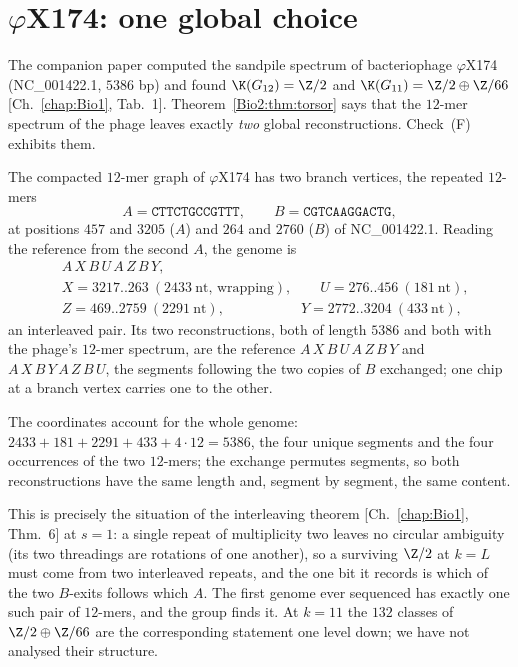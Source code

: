 \section{$\varphi$X174: one global choice}\label{Bio2:sec:phix}

The companion paper computed the sandpile spectrum of bacteriophage $\varphi$X174
(NC\_001422.1, $5386$ bp) and found $\K(G_{12})=\Z/2$ and $\K(G_{11})=\Z/2\oplus\Z/66$
[Ch.~\ref{chap:Bio1}, Tab.~1]. Theorem~\ref{Bio2:thm:torsor} says that the $12$-mer spectrum of the phage
leaves exactly \emph{two} global reconstructions. Check~(F) exhibits them.

\begin{proposition}[$\varphi$X174 at $k=12$]\label{Bio2:prop:phix}
The compacted $12$-mer graph of $\varphi$X174 has two branch vertices, the repeated
$12$-mers
\[
A=\texttt{CTTCTGCCGTTT},\qquad B=\texttt{CGTCAAGGACTG},
\]
at positions $457$ and $3205$ ($A$) and $264$ and $2760$ ($B$) of NC\_001422.1. Reading
the reference from the second $A$, the genome is
\begin{align*}
&A\,X\,B\,U\,A\,Z\,B\,Y,\\
&X=3217..263\ (2433\ \text{nt, wrapping}),\qquad U=276..456\ (181\ \text{nt}),\\
&Z=469..2759\ (2291\ \text{nt}),\qquad\qquad\quad\ \ Y=2772..3204\ (433\ \text{nt}),
\end{align*}
an interleaved pair. Its two reconstructions, both of length $5386$ and both with the
phage's $12$-mer spectrum, are the reference $A\,X\,B\,U\,A\,Z\,B\,Y$ and
$A\,X\,B\,Y\,A\,Z\,B\,U$, the segments following the two copies of $B$ exchanged; one chip
at a branch vertex carries one to the other.
\end{proposition}

The coordinates account for the whole genome: $2433+181+2291+433+4\cdot12=5386$, the
four unique segments and the four occurrences of the two $12$-mers; the exchange
permutes segments, so both reconstructions have the same length and, segment by segment,
the same content.

This is precisely the situation of the interleaving theorem [Ch.~\ref{chap:Bio1}, Thm.~6] at $s=1$:
a single repeat of multiplicity two leaves no circular ambiguity (its two threadings are
rotations of one another), so a surviving $\Z/2$ at $k=L$ must come from two interleaved
repeats, and the one bit it records is which of the two $B$-exits follows which $A$. The
first genome ever sequenced has exactly one such pair of $12$-mers, and the group finds it.
At $k=11$ the $132$ classes of $\Z/2\oplus\Z/66$ are the corresponding statement one
level down; we have not analysed their structure.


